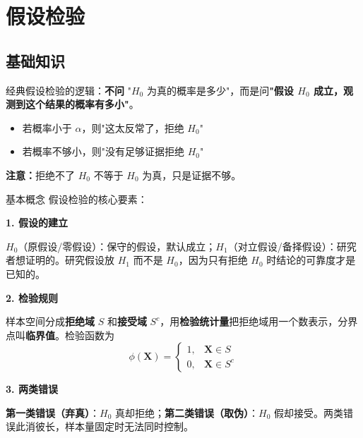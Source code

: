 \chapter{假设检验}
\section{基础知识}
\begin{note}
经典假设检验的逻辑：\textbf{不问} "$H_0$ 为真的概率是多少"，而是问\textbf{"假设 $H_0$ 成立，观测到这个结果的概率有多小"}。

\begin{itemize}
    \item 若概率小于 $\alpha$，则"这太反常了，拒绝 $H_0$"
    \item 若概率不够小，则"没有足够证据拒绝 $H_0$"
\end{itemize}

\textbf{注意：}拒绝不了 $H_0$ 不等于 $H_0$ 为真，只是证据不够。
\end{note}
\begin{definition}{基本概念}
假设检验的核心要素：

\textbf{1. 假设的建立}

$H_0$（原假设/零假设）：保守的假设，默认成立；$H_1$（对立假设/备择假设）：研究者想证明的。研究假设放 $H_1$ 而不是 $H_0$，因为只有拒绝 $H_0$ 时结论的可靠度才是已知的。

\textbf{2. 检验规则}

样本空间分成\textbf{拒绝域} $S$ 和\textbf{接受域} $S^c$，用\textbf{检验统计量}把拒绝域用一个数表示，分界点叫\textbf{临界值}。检验函数为
$$\phi(\boldsymbol{X}) = \begin{cases} 1, & \boldsymbol{X} \in S \\ 0, & \boldsymbol{X} \in S^c \end{cases}$$

\textbf{3. 两类错误}

\textbf{第一类错误（弃真）}：$H_0$ 真却拒绝；\textbf{第二类错误（取伪）}：$H_0$ 假却接受。两类错误此消彼长，样本量固定时无法同时控制。
\end{definition}

